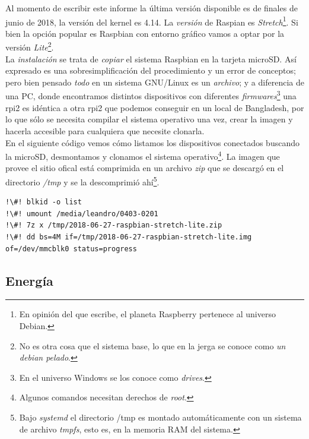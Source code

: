 \documentclass[10pt,a4paper]{article}
\begin{document}
Al momento de escribir este informe la \'ultima versi\'on disponible es de finales de junio de 2018, la versi\'on del kernel es 4.14. La \emph{versi\'on} de Raspian es \emph{Stretch}\footnote{En opini\'on del que escribe, el planeta Raspberry pertenece al universo Debian.}. Si bien la opci\'on popular es Raspbian con entorno gr\'afico vamos a optar por la versi\'on \emph{Lite}\footnote{No es otra cosa que el sistema base, lo que en la jerga se conoce como \emph{un debian pelado}.}.\\

La \emph{instalaci\'on} se trata de \emph{copiar} el sistema Raspbian en la tarjeta microSD. As\'i expresado es una sobresimplificaci\'on del procedimiento y un error de conceptos; pero bien pensado \emph{todo} en un sistema GNU/Linux es un \emph{archivo}; y a diferencia de una PC, donde encontramos distintos dispositivos con diferentes \emph{firmwares}\footnote{En el universo Windows se los conoce como \emph{drives}.} una rpi2 es id\'entica a otra rpi2 que podemos conseguir en un local de Bangladesh, por lo que s\'olo se necesita compilar el sistema operativo una vez, crear la imagen y hacerla accesible para cualquiera que necesite clonarla.\\

En el siguiente c\'odigo vemos c\'omo listamos los dispositivos conectados buscando la microSD, desmontamos y clonamos el sistema operativo\footnote{Algunos comandos necesitan derechos de \emph{root}.}. La imagen que provee el sitio ofical est\'a comprimida en un archivo \emph{zip} que se descarg\'o en el directorio \emph{/tmp} y se la descomprimi\'o ah\'i\footnote{Bajo \emph{systemd} el directorio /tmp es montado autom\'aticamente con un sistema de archivo \emph{tmpfs}, esto es, en la memoria RAM del sistema.}.\\

\begin{scriptsize}
\begin{lstlisting}
!\#! blkid -o list
!\#! umount /media/leandro/0403-0201
!\#! 7z x /tmp/2018-06-27-raspbian-stretch-lite.zip
!\#! dd bs=4M if=/tmp/2018-06-27-raspbian-stretch-lite.img of=/dev/mmcblk0 status=progress
\end{lstlisting}
\end{scriptsize}

\subsection{Energ\'ia}
\end{document}
